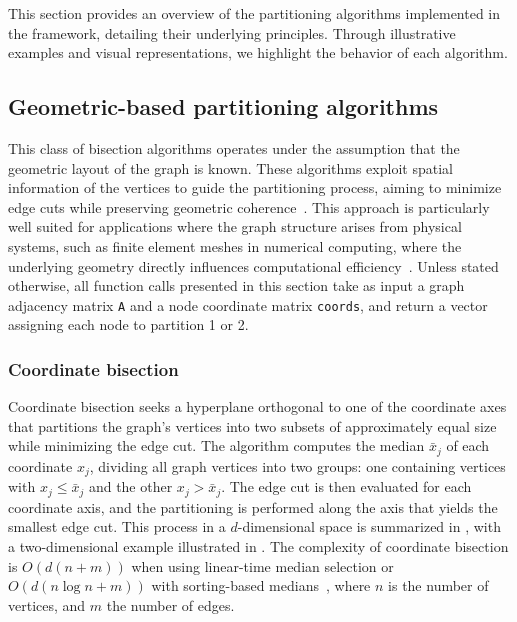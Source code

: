 % 
    This section provides an overview of the partitioning algorithms implemented
    in the framework, detailing their underlying principles.
    Through illustrative examples and visual representations, we highlight the behavior of each algorithm.

    \subsection{Geometric-based partitioning algorithms}
    \label{subsec:geo}
    This class of bisection algorithms operates under the assumption that the geometric layout of the
    graph is known.
    These algorithms exploit spatial information of the vertices to guide the
    partitioning process, aiming to minimize edge cuts while preserving geometric
    coherence~\cite{doi:10.1137/S1064827594275339}.
    This approach is particularly well suited for applications where the graph structure
    arises from physical systems, such as finite element meshes in numerical computing,
    where the underlying geometry directly influences computational efficiency~\cite{buluc2015recentadvancesgraphpartitioning}. Unless stated otherwise, all function calls presented in this section take as input a graph adjacency matrix \texttt{A} and a node coordinate matrix \texttt{coords}, and return a vector assigning each node to partition 1 or 2.
    \subsubsection{Coordinate bisection}
    \label{subsubsec:coord}
    Coordinate bisection seeks a hyperplane orthogonal to one of the coordinate axes that partitions the graph's vertices into two subsets of approximately equal size
    while minimizing the edge cut.
    The algorithm computes the median $\bar{x}_j$ of each coordinate $x_j$,
    dividing all graph vertices into two groups: one containing vertices with $x_j \leq \bar{x}_j$ and the other $x_j > \bar{x}_j$. The edge cut is then evaluated for each coordinate axis, and the
    partitioning is performed along the axis that yields the smallest edge cut.
    This process in a $d$-dimensional space is summarized in , with a two-dimensional example illustrated in .
    The complexity of coordinate bisection is $O(d(n+m))$ when using linear-time median selection or $O(d(n \log n + m))$ with sorting-based medians~\cite{10.5555/1614191}, where $n$ is the number of vertices, and $m$ the number of edges.

